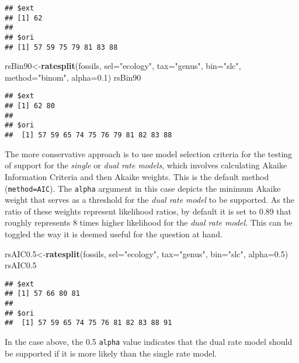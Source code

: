 \documentclass[]{article}
\newenvironment{Shaded}{\begin{snugshade}}{\end{snugshade}}
\newcommand{\KeywordTok}[1]{\textcolor[rgb]{0.13,0.29,0.53}{\textbf{{#1}}}}
\newcommand{\DataTypeTok}[1]{\textcolor[rgb]{0.13,0.29,0.53}{{#1}}}
\newcommand{\FloatTok}[1]{\textcolor[rgb]{0.00,0.00,0.81}{{#1}}}
\newcommand{\StringTok}[1]{\textcolor[rgb]{0.31,0.60,0.02}{{#1}}}
\newcommand{\NormalTok}[1]{{#1}}
\begin{document}
\begin{verbatim}
## $ext
## [1] 62
## 
## $ori
## [1] 57 59 75 79 81 83 88
\end{verbatim}

\begin{Shaded}
\begin{Highlighting}[]
\NormalTok{rsBin90<-}\KeywordTok{ratesplit}\NormalTok{(fossils, }\DataTypeTok{sel=}\StringTok{"ecology"}\NormalTok{, }\DataTypeTok{tax=}\StringTok{"genus"}\NormalTok{, }
  \DataTypeTok{bin=}\StringTok{"slc"}\NormalTok{, }\DataTypeTok{method=}\StringTok{"binom"}\NormalTok{, }\DataTypeTok{alpha=}\FloatTok{0.1}\NormalTok{)}
\NormalTok{rsBin90}
\end{Highlighting}
\end{Shaded}

\begin{verbatim}
## $ext
## [1] 62 80
## 
## $ori
##  [1] 57 59 65 74 75 76 79 81 82 83 88
\end{verbatim}

The more conservative approach is to use model selection criteria for
the testing of support for the \emph{single } or \emph{dual rate
models}, which involves calculating Akaike Information Criteria and then
Akaike weights. This is the default method (\texttt{method=AIC}). The
\texttt{alpha} argument in this case depicts the minimum Akaike weight
that serves as a threshold for the \emph{dual rate model} to be
supported. As the ratio of these weights represent likelihood ratios, by
default it is set to 0.89 that roughly represents 8 times higher
likelihood for the \emph{dual rate model}. This can be toggled the way
it is deemed useful for the question at hand.

\begin{Shaded}
\begin{Highlighting}[]
\NormalTok{rsAIC0}\FloatTok{.5}\NormalTok{<-}\KeywordTok{ratesplit}\NormalTok{(fossils, }\DataTypeTok{sel=}\StringTok{"ecology"}\NormalTok{, }\DataTypeTok{tax=}\StringTok{"genus"}\NormalTok{, }
  \DataTypeTok{bin=}\StringTok{"slc"}\NormalTok{, }\DataTypeTok{alpha=}\FloatTok{0.5}\NormalTok{)}
\NormalTok{rsAIC0}\FloatTok{.5}
\end{Highlighting}
\end{Shaded}

\begin{verbatim}
## $ext
## [1] 57 66 80 81
## 
## $ori
##  [1] 57 59 65 74 75 76 81 82 83 88 91
\end{verbatim}

In the case above, the 0.5 \texttt{alpha} value indicates that the dual
rate model should be supported if it is more likely than the single rate
model.
\end{document}
